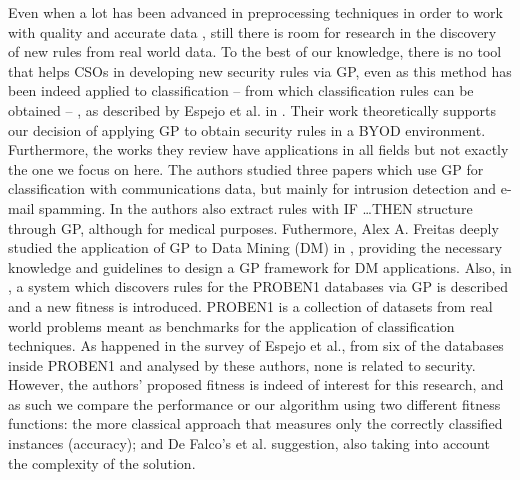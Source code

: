 \documentclass[a4paper,10pt,twocolumn,preprint,3p]{elsarticle}
\begin{document}
Even when a lot has been advanced in preprocessing techniques in order to work with quality and accurate data \cite{han2011data}, still there is room for research in the discovery of new rules from real world data. To the best of our knowledge, there is no tool that helps CSOs in
developing new security rules via GP, %
 even as this method has been
indeed applied to classification -- from which classification rules
can be obtained -- , as described by Espejo et al. in
\cite{espejo2010survey}. Their work theoretically supports our
decision of applying GP to obtain security rules in a BYOD
environment. Furthermore, the works they review have applications in
all fields but not exactly the one we focus on here. The authors
studied three papers which use GP for classification with
communications data, but mainly for intrusion detection and e-mail
spamming. In \cite{Tsakonas2004195} the authors also extract rules with \textsc{IF \ldots THEN} structure through GP, although for medical purposes. Futhermore, Alex A. Freitas deeply studied the application of GP to Data Mining (DM) in \cite{freitas2002data}, providing the necessary knowledge and guidelines to design a GP framework for DM applications. Also, in \cite{DeFalco2002257}, a system which discovers
rules for the PROBEN1 databases via GP is described and a new fitness is introduced. PROBEN1 \cite{prechelt1994proben} is a collection of datasets from real world problems meant as benchmarks for the application of classification techniques. As happened in 
the survey of Espejo et al., from six of the databases inside PROBEN1 and
analysed by these authors, none is related to security. However, the
authors' proposed fitness is indeed of interest for this research, and
as such we compare the performance or our algorithm using two
different fitness functions: the more classical approach that measures only the correctly classified instances (accuracy); and De Falco's et al. \cite{DeFalco2002257} suggestion, also taking into account the complexity of the solution. 
\end{document}
